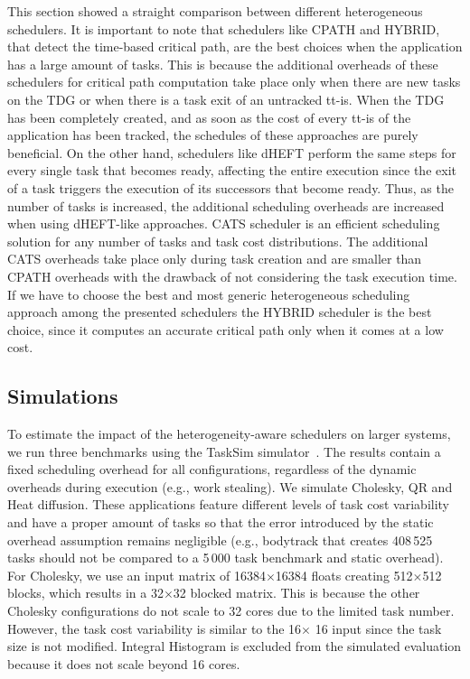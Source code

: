 
This section showed a straight comparison between different heterogeneous schedulers.
It is important to note that schedulers like CPATH and HYBRID, that detect the time-based critical path, are the best choices when the application has a large amount of tasks.
This is because the additional overheads of these schedulers for critical path computation take place only when there are new tasks on the TDG or when there is a task exit of an untracked tt-is. 
When the TDG has been completely created, and as soon as the cost of every tt-is of the application has been tracked, the schedules of these approaches are purely beneficial.
On the other hand, schedulers like dHEFT perform the same steps for every single task that becomes ready, affecting the entire execution since the exit of a task triggers the execution of its successors that become ready. 
Thus, as the number of tasks is increased, the additional scheduling overheads are increased when using dHEFT-like approaches.
CATS scheduler is an efficient scheduling solution for any number of tasks and task cost distributions.
The additional CATS overheads take place only during task creation and are smaller than CPATH overheads with the drawback of not considering the task execution time.
If we have to choose the best and most generic heterogeneous scheduling approach among the presented schedulers the HYBRID scheduler is the best choice, since it computes an accurate critical path only when it comes at a low cost.


\subsection{Simulations}
To estimate the impact of the heterogeneity-aware schedulers on larger systems, we run three benchmarks using the TaskSim simulator~\cite{AbstrLevels_TACO12}.
The results contain a fixed scheduling overhead for all configurations, regardless of the dynamic overheads during execution (e.g., work stealing).
We simulate Cholesky, QR and Heat diffusion.
These applications feature different levels of task cost variability and have a proper amount of tasks so that the error introduced by the static overhead assumption remains negligible (e.g., bodytrack that creates 408\,525 tasks should not be compared to a 5\,000 task benchmark and static overhead).
For Cholesky, we use an input matrix of 16384$\times$16384 floats creating 512$\times$512 blocks, which results in a 32$\times$32 blocked matrix. This is because the other Cholesky configurations do not scale to 32 cores due to the limited task number. However, the task cost variability is similar to the 16$\times$ 16 input since the task size is not modified. Integral Histogram is excluded from the simulated evaluation because it does not scale beyond 16 cores.

